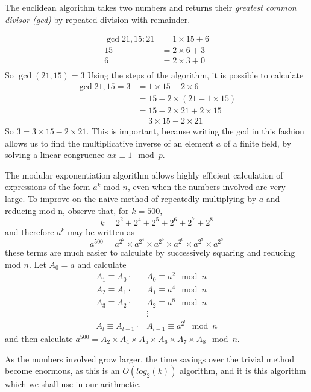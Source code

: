 \begin{definition}
	The euclidean algorithm takes two numbers and returns their \emph{greatest common divisor (gcd)} by repeated division with remainder.
\end{definition}
\begin{align*}
	\gcd{21,15}:21 &= 1\times15 + 6\\
	15 &= 2\times6 + 3\\
	6 &= 2\times3 + 0\\
\end{align*}
So $\gcd(21,15)=3$
Using the steps of the algorithm, it is possible to calculate
\begin{align*}
	\gcd{21,15} = 3 &= 1\times15 - 2\times6\\
	&= 15 - 2\times(21 - 1\times15)\\
	&= 15 - 2\times21 + 2\times15\\
	&=3\times15 - 2\times21
\end{align*}
So $3 = 3\times15 - 2\times21$. This is important, because writing the gcd in this fashion allows us to find the multiplicative inverse of an element $a$ of a finite field, by solving a linear congruence $ax\equiv 1 \mod p$.
\begin{definition}
	The modular exponentiation algorithm allows highly efficient calculation of expressions of the form $a^k$ mod $n$, even when the numbers involved are very large. To improve on the naive method of repeatedly multiplying by $a$ and reducing mod n, observe that, for $k=500$,
$$k=2^2+2^4+2^5+2^6+2^7+2^8$$
and therefore $a^k$ may be written as
$$a^{500} = a^{2^{2}} \times a^{2^{4}} \times a^{2^{5}} \times a^{2^{6}} \times a^{2^{7}} \times a^{2^{8}}$$
these terms are much easier to calculate by successively squaring and reducing mod $n$. Let $A_0 = a$ and calculate
\begin{align*}
	A_1\equiv A_0\cdot &A_0 \equiv a^2 \mod n\\
	A_2\equiv A_1\cdot &A_1 \equiv a^4 \mod n\\
	A_3\equiv A_2\cdot &A_2 \equiv a^8 \mod n\\
	&\vdots\\
	A_l\equiv A_{l-1}\cdot &A_{l-1} \equiv a^{2^{l}} \mod n
\end{align*}
and then calculate $a^{500} = A_2 \times A_4 \times A_5 \times A_6 \times A_7 \times A_8 \mod n$.
\end{definition}
As the numbers involved grow larger, the time savings over the trivial method become enormous, as this is an $O(log_2(k))$ algorithm, and it is this algorithm which we shall use in our arithmetic.
